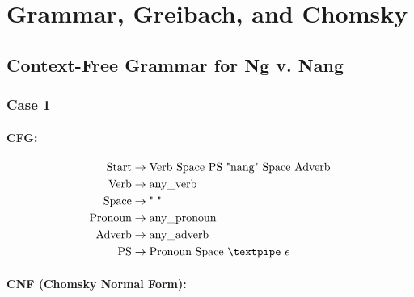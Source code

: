\section{Grammar, Greibach, and Chomsky}
\subsection{Context-Free Grammar for Ng v. Nang}


\subsubsection{Case 1}

\paragraph{CFG:}

\begin{equation*}
    \begin{aligned}
        \text{Start}   & \rightarrow \text{Verb Space PS "nang" Space Adverb}   \\
        \text{Verb}    & \rightarrow \text{any\_verb}                           \\
        \text{Space}   & \rightarrow \text{" "}                                 \\
        \text{Pronoun} & \rightarrow \text{any\_pronoun}                        \\
        \text{Adverb}  & \rightarrow \text{any\_adverb}                         \\
        \text{PS}      & \rightarrow \text{Pronoun Space {\textpipe} } \epsilon
    \end{aligned}
\end{equation*}

\paragraph{CNF (Chomsky Normal Form):}

